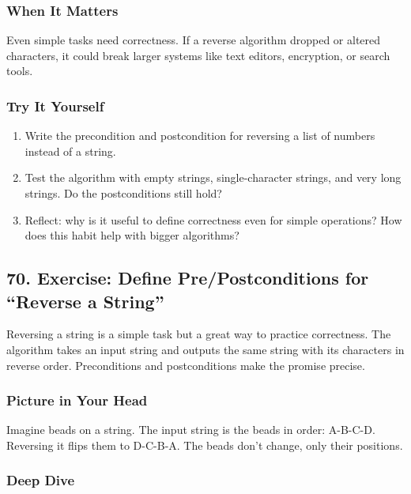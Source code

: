 \documentclass[
  letterpaper,
  DIV=11,
  numbers=noendperiod]{scrreprt}
\providecommand{\tightlist}{%
  \setlength{\itemsep}{0pt}\setlength{\parskip}{0pt}}
\begin{document}
\subsubsection{When It Matters}\label{when-it-matters-67}

Even simple tasks need correctness. If a reverse algorithm dropped or
altered characters, it could break larger systems like text editors,
encryption, or search tools.

\subsubsection{Try It Yourself}\label{try-it-yourself-69}

\begin{enumerate}
\def\labelenumi{\arabic{enumi}.}
\tightlist
\item
  Write the precondition and postcondition for reversing a list of
  numbers instead of a string.
\item
  Test the algorithm with empty strings, single-character strings, and
  very long strings. Do the postconditions still hold?
\item
  Reflect: why is it useful to define correctness even for simple
  operations? How does this habit help with bigger algorithms?
\end{enumerate}

\subsection{70. Exercise: Define Pre/Postconditions for ``Reverse a
String''}\label{exercise-define-prepostconditions-for-reverse-a-string-1}

Reversing a string is a simple task but a great way to practice
correctness. The algorithm takes an input string and outputs the same
string with its characters in reverse order. Preconditions and
postconditions make the promise precise.

\subsubsection{Picture in Your Head}\label{picture-in-your-head-70}

Imagine beads on a string. The input string is the beads in order:
A-B-C-D. Reversing it flips them to D-C-B-A. The beads don't change,
only their positions.

\subsubsection{Deep Dive}\label{deep-dive-40}
\end{document}
